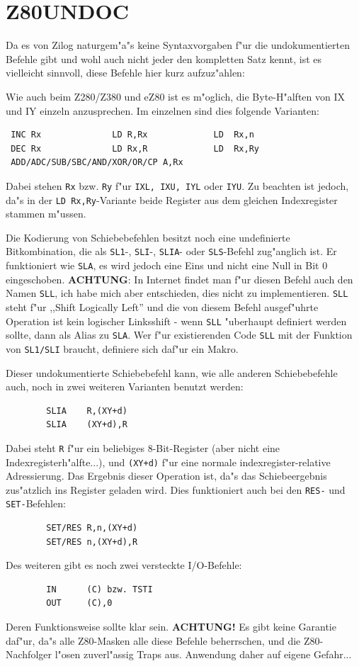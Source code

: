 \documentclass[12pt,a4paper,twoside]{report}
\newcommand{\bb}[1]{{\bf #1}}
\newcommand{\tty}[1]{{\tt #1}}
\begin{document}

\section{Z80UNDOC}

Da es von Zilog naturgem"a"s keine Syntaxvorgaben f"ur die undokumentierten
Befehle gibt und wohl auch nicht jeder den kompletten Satz kennt,
ist es vielleicht sinnvoll, diese Befehle hier kurz aufzuz"ahlen:
\par
Wie auch beim Z280/Z380 und eZ80 ist es m"oglich, die Byte-H"alften von IX und IY
einzeln anzusprechen.  Im einzelnen sind dies folgende Varianten:
\begin{verbatim}
 INC Rx              LD R,Rx             LD  Rx,n
 DEC Rx              LD Rx,R             LD  Rx,Ry
 ADD/ADC/SUB/SBC/AND/XOR/OR/CP A,Rx
\end{verbatim}
Dabei stehen \tty{Rx} bzw. \tty{Ry} f"ur \tty{IXL, IXU, IYL} oder
\tty{IYU}.  Zu beachten ist jedoch, da"s in der \tty{LD Rx,Ry}-Variante
beide Register aus dem gleichen Indexregister stammen m"ussen.
\par
Die Kodierung von Schiebebefehlen besitzt noch eine undefinierte
Bitkombination, die als \tty{SL1}-, \tty{SLI}-, \tty{SLIA}- oder
\tty{SLS}-Befehl zug"anglich ist.  Er funktioniert wie \tty{SLA},
es wird jedoch eine Eins und nicht eine Null in Bit 0 eingeschoben.
\bb{ACHTUNG}: In Internet findet man f"ur diesen Befehl auch den
Namen \tty{SLL}, ich habe mich aber entschieden, dies nicht zu
implementieren.  \tty{SLL} steht f"ur ,,Shift Logically Left'' und
die von diesem Befehl ausgef"uhrte Operation ist kein logischer
Linksshift - wenn \tty{SLL} "uberhaupt definiert werden sollte, dann
als Alias zu \tty{SLA}.  Wer f"ur existierenden Code \tty{SLL} mit
der Funktion von \tty{SL1/SLI} braucht, definiere sich daf"ur ein
Makro.

Dieser undokumentierte Schiebebefehl kann, wie alle anderen
Schiebebefehle auch, noch in zwei weiteren Varianten benutzt
werden:
\begin{verbatim}
        SLIA    R,(XY+d)
        SLIA    (XY+d),R
\end{verbatim}
Dabei steht \tty{R} f"ur ein beliebiges 8-Bit-Register (aber nicht eine
Indexregisterh"alfte...), und \tty{(XY+d)} f"ur eine normale
indexregister-relative Adressierung.  Das Ergebnis dieser Operation
ist, da"s das Schiebeergebnis zus"atzlich ins Register geladen wird.
Dies funktioniert auch bei den \tty{RES-} und \tty{SET-}Befehlen:
\begin{verbatim}
        SET/RES R,n,(XY+d)
        SET/RES n,(XY+d),R
\end{verbatim}
Des weiteren gibt es noch zwei versteckte I/O-Befehle:
\begin{verbatim}
        IN      (C) bzw. TSTI
        OUT     (C),0
\end{verbatim}
Deren Funktionsweise sollte klar sein.  \bb{ACHTUNG!} Es gibt keine
Garantie daf"ur, da"s alle Z80-Masken alle diese Befehle beherrschen,
und die Z80-Nachfolger l"osen zuverl"assig Traps aus.  Anwendung
daher auf eigene Gefahr...
\end{document}
